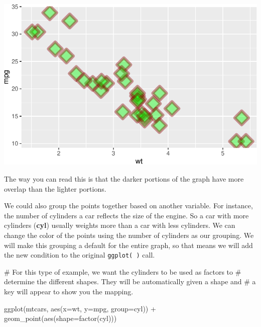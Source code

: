 \documentclass[
  letterpaper,
  DIV=11,
  numbers=noendperiod]{scrreprt}
\newenvironment{Shaded}{\begin{snugshade}}{\end{snugshade}}
\newcommand{\AttributeTok}[1]{\textcolor[rgb]{0.40,0.45,0.13}{#1}}
\newcommand{\CommentTok}[1]{\textcolor[rgb]{0.37,0.37,0.37}{#1}}
\newcommand{\FunctionTok}[1]{\textcolor[rgb]{0.28,0.35,0.67}{#1}}
\newcommand{\NormalTok}[1]{\textcolor[rgb]{0.00,0.23,0.31}{#1}}
\newcommand{\SpecialCharTok}[1]{\textcolor[rgb]{0.37,0.37,0.37}{#1}}
\begin{document}
\includegraphics{Advanced_Scatterplot_Techniques_files/figure-pdf/unnamed-chunk-8-1.pdf}

The way you can read this is that the darker portions of the graph have
more overlap than the lighter portions.

We could also group the points together based on another variable. For
instance, the number of cylinders a car reflects the size of the engine.
So a car with more cylinders (\textbf{cyl}) usually weights more than a
car with less cylinders. We can change the color of the points using the
number of cylinders as our grouping. We will make this grouping a
default for the entire graph, so that means we will add the new
condition to the original \texttt{ggplot(\ )} call.

\begin{Shaded}
\begin{Highlighting}[]
\CommentTok{\# For this type of example, we want the cylinders to be used as factors to }
\CommentTok{\# determine the different shapes. They will be automatically given a shape and}
\CommentTok{\# a key will appear to show you the mapping.}

\FunctionTok{ggplot}\NormalTok{(mtcars, }\FunctionTok{aes}\NormalTok{(}\AttributeTok{x=}\NormalTok{wt, }\AttributeTok{y=}\NormalTok{mpg, }\AttributeTok{group=}\NormalTok{cyl)) }\SpecialCharTok{+}
  \FunctionTok{geom\_point}\NormalTok{(}\FunctionTok{aes}\NormalTok{(}\AttributeTok{shape=}\FunctionTok{factor}\NormalTok{(cyl)))}
\end{Highlighting}
\end{Shaded}
\end{document}
